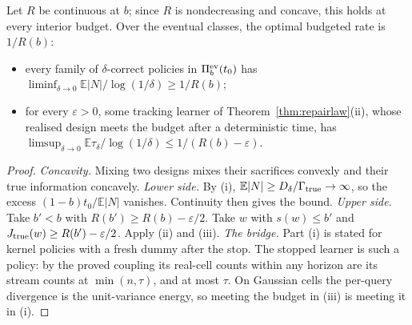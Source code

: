 \begin{corollary}
\label{cor:repairrate}
Let $R$ be continuous at $b$; since $R$ is nondecreasing and concave, this holds at every
interior budget. Over the eventual classes, the optimal budgeted rate is $1/R(b)$:
\begin{itemize}
\item every family of $\delta$-correct policies in $\Pi_b^{\rm ev}(t_0)$ has
$\liminf_{\delta\to0}\mathbb E|N|/\log(1/\delta)\ge1/R(b)$;
\item for every $\varepsilon>0$, some tracking learner of Theorem~\ref{thm:repairlaw}(ii),
whose realised design meets the budget after a deterministic time, has
$\limsup_{\delta\to0}\mathbb E\tau_\delta/\log(1/\delta)\le1/(R(b)-\varepsilon)$.
\end{itemize}
\end{corollary}
\begin{proof}
\emph{Concavity.} Mixing two designs mixes their sacrifices convexly and their true
information concavely.
\emph{Lower side.} By (i), $\mathbb E|N|\ge D_\delta/\Gamma_{\rm true}\to\infty$, so the
excess $(1-b)t_0/\mathbb E|N|$ vanishes. Continuity then gives the bound.
\emph{Upper side.} Take $b'<b$ with $R(b')\ge R(b)-\varepsilon/2$. Take $w$ with $s(w)\le b'$
and $J_{\rm true}(w)\ge R(b')-\varepsilon/2$. Apply (ii) and (iii).
\emph{The bridge.} Part (i) is stated for kernel policies with a fresh dummy after the stop.
The stopped learner is such a policy: by the proved coupling its real-cell counts within any
horizon are its stream counts at $\min(n,\tau)$, and at most $\tau$. On Gaussian cells the
per-query divergence is the unit-variance energy, so meeting the budget in (iii) is meeting it
in (i).
\end{proof}

